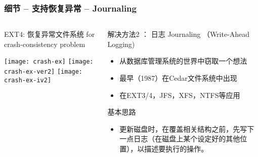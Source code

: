 \begin{frame}[fragile]
	\frametitle{细节 -- 支持恢复异常 -- Journaling}
	\begin{columns}
		\begin{column}{.4\textwidth}
			EXT4: 恢复异常文件系统 for crash-consistency problem
			
			\centering
			\texttt{[image: crash-ex]}
			\texttt{[image: crash-ex-ver2]}
			\texttt{[image: crash-ex-iv2]}	
		\end{column}
		\begin{column}{.6\textwidth}			
			解决方法2 ： 日志 Journaling （Write-Ahead Logging)
			\begin{itemize}
				\item 从数据库管理系统的世界中窃取一个想法
				\item 最早（1987）在Cedar文件系统中出现
				\item 在EXT3/4，JFS，XFS，NTFS等应用
			\end{itemize}
			\pause
			基本思路
			\begin{itemize}	
				\item 更新磁盘时，在覆盖相关结构之前，先写下一点日志（在磁盘上某个设定好的其他位置），以描述要执行的操作。
			\end{itemize}

		\end{column}
	\end{columns}
	
\end{frame}


